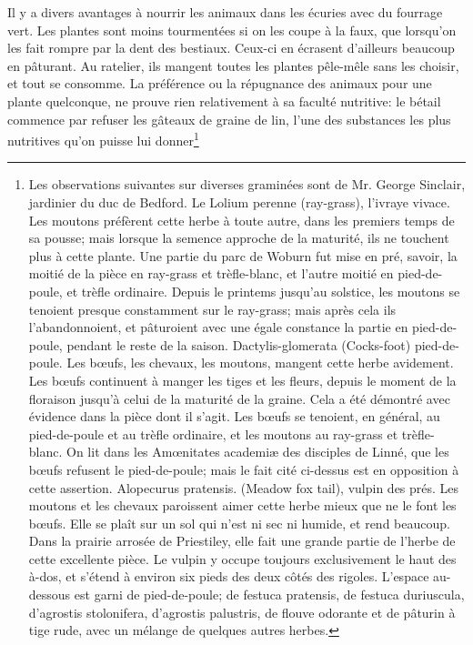 Il y a divers avantages à nourrir les animaux dans les écuries avec du fourrage vert. Les plantes sont moins tourmentées si on les coupe à la faux, que lorsqu'on les fait rompre par la dent des bestiaux. Ceux-ci en écrasent d'ailleurs beaucoup en pâturant. Au ratelier, ils mangent toutes les plantes pêle-mêle sans les choisir, et tout se consomme. La préférence ou la répugnance des animaux pour une plante quelconque, ne prouve rien relativement à sa faculté nutritive:\setcounter{page}{294} le bétail commence par refuser les gâteaux de graine de lin, l'une des substances les plus nutritives qu'on puisse lui donner\footnote{Les observations suivantes sur diverses graminées sont de Mr. George Sinclair, jardinier du duc de Bedford. Le Lolium perenne (ray-grass), l'ivraye vivace. Les moutons préfèrent cette herbe à toute autre, dans les premiers temps de sa pousse; mais lorsque la semence approche de la maturité, ils ne touchent plus à cette plante. Une partie du parc de Woburn fut mise en pré, savoir, la moitié de la pièce en ray-grass et trèfle-blanc, et l'autre moitié en pied-de-poule, et trèfle ordinaire. Depuis le printems jusqu'au solstice, les moutons se tenoient presque constamment sur le ray-grass; mais après cela ils l'abandonnoient, et pâturoient avec une égale constance la partie en pied-de-poule, pendant le reste de la saison.
Dactylis-glomerata (Cocks-foot) pied-de-poule. Les bœufs, les chevaux, les moutons, mangent cette herbe avidement. Les bœufs continuent à manger les tiges et les fleurs, depuis le moment de la floraison jusqu'à celui de la maturité de la graine. Cela a été démontré avec évidence dans la pièce dont il s'agit. Les bœufs se tenoient, en général, au pied-de-poule et au trèfle ordinaire, et les moutons au ray-grass et trèfle-blanc. On lit dans les Amœnitates academiæ des disciples de Linné, que les bœufs refusent le pied-de-poule; mais le fait cité ci-dessus est en opposition à cette assertion.
Alopecurus pratensis. (Meadow fox tail), vulpin des prés. Les moutons et les chevaux paroissent aimer cette herbe mieux que ne le font les bœufs. Elle se plaît sur un sol qui n'est ni sec ni humide, et rend beaucoup. Dans la prairie arrosée de Priestiley, elle fait une grande partie de l'herbe de cette excellente pièce. Le vulpin y occupe toujours exclusivement le haut des à-dos, et s'étend à environ six pieds des deux côtés des rigoles. L'espace au-dessous est garni de pied-de-poule; de festuca pratensis, de festuca duriuscula, d'agrostis stolonifera, d'agrostis palustris, de flouve odorante et de pâturin à tige rude, avec un mélange de quelques autres herbes.
}
